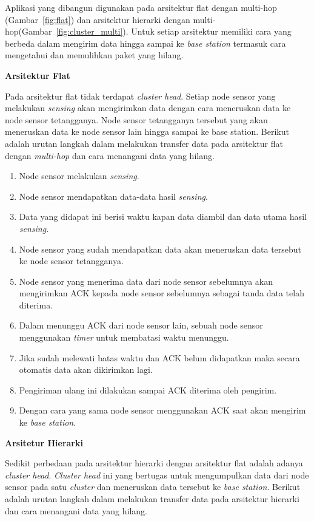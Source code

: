 \documentclass[a4paper,twoside]{article}
\begin{document}
\begin{enumerate}
Aplikasi yang dibangun digunakan pada arsitektur flat dengan multi-hop (Gambar~\ref{fig:flat}) dan arsitektur hierarki dengan multi-hop(Gambar~\ref{fig:cluster_multi}). Untuk setiap arsitektur memiliki cara yang berbeda dalam mengirim data hingga sampai ke \textit{base station} termasuk cara mengetahui dan memulihkan paket yang hilang.

\textbf{Arsitektur Flat}

Pada arsitektur flat tidak terdapat \textit{cluster head}. Setiap node sensor yang melakukan \textit{sensing} akan mengirimkan data dengan cara meneruskan data ke node sensor tetangganya. Node sensor tetangganya tersebut yang akan meneruskan data ke node sensor lain hingga sampai ke base station. Berikut adalah urutan langkah dalam melakukan transfer data pada arsitektur flat dengan \textit{multi-hop} dan cara menangani data yang hilang.

\begin{enumerate}
	\item Node sensor melakukan \textit{sensing}.
	\item Node sensor mendapatkan data-data hasil \textit{sensing}.
	\item Data yang didapat ini berisi waktu kapan data diambil dan data utama hasil \textit{sensing}.
	\item Node sensor yang sudah mendapatkan data akan meneruskan data tersebut ke node sensor tetangganya.
	\item Node sensor yang menerima data dari node sensor sebelumnya akan mengirimkan ACK kepada node sensor sebelumnya sebagai tanda data telah diterima.
	\item Dalam menunggu ACK dari node sensor lain, sebuah node sensor menggunakan \textit{timer} untuk membatasi waktu menunggu.
	\item Jika sudah melewati batas waktu dan ACK belum didapatkan maka secara otomatis data akan dikirimkan lagi.
	\item Pengiriman ulang ini dilakukan sampai ACK diterima oleh pengirim.
	\item Dengan cara yang sama node sensor menggunakan ACK saat akan mengirim ke \textit{base station}.
\end{enumerate}

\textbf{Arsitetur Hierarki}

Sedikit perbedaan pada arsitektur hierarki dengan arsitektur flat adalah adanya \textit{cluster head}. \textit{Cluster head} ini yang bertugas untuk mengumpulkan data dari node sensor pada satu \textit{cluster} dan meneruskan data tersebut ke \textit{base station}. Berikut adalah urutan langkah dalam melakukan transfer data pada arsitektur hierarki dan cara menangani data yang hilang.


\end{enumerate}
\end{document}
